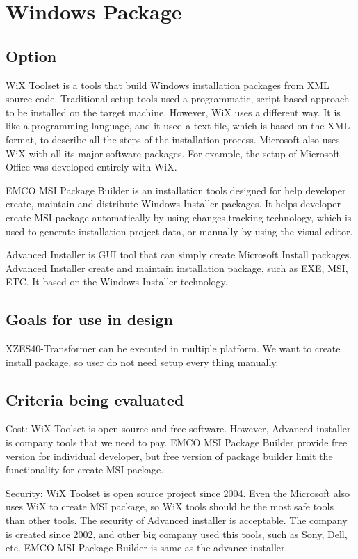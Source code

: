 \section{Windows Package}

\subsection{Option}
WiX Toolset is a tools that build Windows installation packages from XML source code. Traditional setup tools used a programmatic, script-based approach to be installed on the target machine. However, WiX uses a different way. It is like a programming language, and it used a text file, which is based on the XML format, to describe all the steps of the installation process. Microsoft also uses WiX with all its major software packages. For example, the setup of Microsoft Office was developed entirely with WiX. \cite{Wix_tool}

EMCO MSI Package Builder is an installation tools designed for help developer create, maintain and distribute Windows Installer packages. \cite{EMCO_MSI} It helps developer create MSI package automatically by using changes tracking technology, which is used to generate installation project data, or manually by using the visual editor.

Advanced Installer is GUI tool that can simply create Microsoft Install packages. Advanced Installer create and maintain installation package, such as EXE, MSI, ETC. It based on the Windows Installer technology. \cite{advanced_install}

\subsection{Goals for use in design}
XZES40-Transformer can be executed in multiple platform. We want to create install package, so user do not need setup every thing manually. 

\subsection{Criteria being evaluated}
Cost: WiX Toolset is open source and free software. However, Advanced installer is company tools that we need to pay. EMCO MSI Package Builder provide free version for individual developer, but free version of package builder limit the functionality for create MSI package.

Security: WiX Toolset is open source project since 2004. Even the Microsoft also uses WiX to create MSI package, so WiX tools should be the most safe tools than other tools. The security of Advanced installer is acceptable. The company is created since 2002, and other big company used this tools, such as Sony, Dell, etc. EMCO MSI Package Builder is same as the advance installer.

